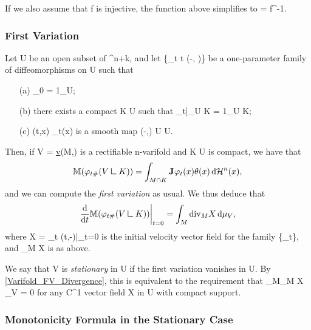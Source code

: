 \documentclass[a4paper, 11pt]{article}
\theoremstyle{plain}
\theoremstyle{definition}
\theoremstyle{remark}
\DeclareMathOperator{\diff}{d \!}
\newcommand{\mres}{\mathrel{\vrule height 1.6ex depth 0pt width 0.13ex\vrule height 0.13ex depth 0pt width 1.3ex}} %
\renewcommand{\div}{\text{div}} %
\numberwithin{equation}{subsection}
\def\({}
\def\){}
\begin{document}
If we also assume that \(f\) is injective, the function \(\tilde{\theta}\) above simplifies to \(\tilde{\theta} = \theta \circ f^{-1}\).



\subsubsection{First Variation}

Let \(U\) be an open subset of \(^{n+k}\), and let \(\{\varphi_{t} \vcentcolon t \in (-\varepsilon, \varepsilon)\}\) be a one-parameter family of diffeomorphisms on \(U\) such that
\begin{itemize}
\item[(a)] \(\varphi_{0} = 1_{U}\);
\item[(b)] there exists a compact \(K \subset U\) such that \(\varphi_{t}|_{U \setminus K} = 1_{U \setminus K}\);
\item[(c)] \((t,x) \longmapsto \varphi_{t}(x)\) is a smooth map \((-\varepsilon,\varepsilon) \times U \longrightarrow U\).
\end{itemize}

Then, if \(V = \underline{v}(M,\theta)\) is a rectifiable \(n\)-varifold and \(K \subset U\) is compact, we have that
\begin{equation}
\mathbb{M}(\varphi_{t\#}(V \mres K)) = \int_{M \cap K} \mathbf{J}_{} \varphi_{t}(x) \theta(x) \diff \mathcal{H}^{n}(x),
\end{equation}
and we can compute the \emph{first variation} as usual. We thus deduce that
\begin{equation}
\label{Varifold_FV_Divergence}
\frac{\!\diff}{\diff t}\mathbb{M}(\varphi_{t\#}(V \mres K))\bigg|_{t=0} = \int_{M} \div_{M} X \diff \mu_{V},
\end{equation}
where \(X = \partial_t \varphi(t,-)\big|_{t=0}\) is the initial velocity vector field for the family \(\{\varphi_t\}\), and \(\div_M X\) is as above.

We say that \(V\) is \emph{stationary} in \(U\) if the first variation vanishes in \(U\). By \eqref{Varifold_FV_Divergence}, this is equivalent to the requirement that \(\int_{M}\div_M X \diff \mu_V = 0\) for any \(C^1\) vector field \(X\) in \(U\) with compact support.

\subsubsection{Monotonicity Formula in the Stationary Case}
\end{document}
